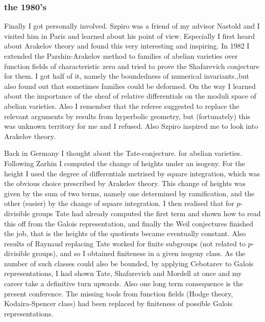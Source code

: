 \documentclass{beamer}
\begin{document}
\begin{frame}
\frametitle{the 1980's}

Finally I got personally involved. Szpiro was a friend of my advisor Nastold and I visited him in Paris and learned about his point of view. Especially I first heard about Arakelov theory and found this very interesting and inspiring. In 1982 I extended the Parshin-Arakelov method to families of abelian varieties over function fields of characteristic zero and tried to prove the Shafarevich conjecture for them.  I got half of it, namely the boundedness of numerical invariants.,but also found out that sometimes families could be deformed. On the way I learned about the importance of the sheaf of relative differentials on the moduli space of abelian varieties. Also I remember that the referee suggested to replace the relevant arguments by results from hyperbolic geometry,  but (fortunately) this was unknown territory for me and I refused. Also Szpiro inspired me to look into Arakelov theory.
\end{frame}
\begin{frame}

Back in Germany I thought about the Tate-conjecture. for abelian varieties. Following Zarhin I computed the change of heights under an isogeny. For the height I used the degree of differentials metrised by square integration, which was the obvious choice prescribed by Arakelov theory. This change of heights was given by the sum of two terms, namely one determined by ramification, and the other (easier) by the change of square integration. I then realised that for $p$-divisible groups Tate had already computed the first term and shown how to read this off from the Galois representation, and finally the Weil conjectures finished the job,  that is the heights of the quotients became eventually constant. Also results of Raynaud replacing Tate worked for finite subgroups (not related to $p$-divisible groups), and so I obtained finiteness in a given isogeny class. As the number of such classes could also be bounded, by applying Cebotarev to Galois representations, I had shown Tate, Shafarevich and Mordell at once and my career take a definitive turn upwards. Also one long term consequence is the present conference. The missing tools from function fields (Hodge theory, Kodaira-Spencer class) had been replaced by finiteness of possible Galois representations.


\end{frame}
\end{document}
